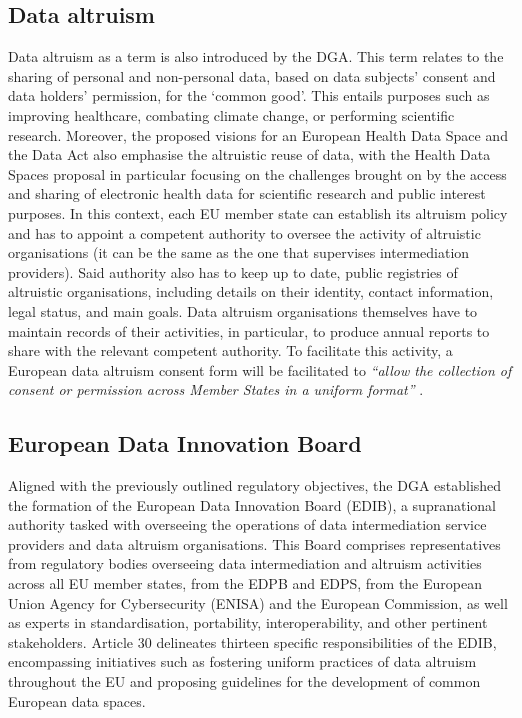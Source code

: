 \subsection{Data altruism}
\label{sec:altruism}

Data altruism as a term is also introduced by the DGA.
This term relates to the sharing of personal and non-personal data, based on data subjects' consent and data holders' permission, for the `common good'.
This entails purposes such as improving healthcare, combating climate change, or performing scientific research.
Moreover, the proposed visions for an European Health Data Space \citeyearpar{noauthor_proposal_2022} and the Data Act \citeyearpar{noauthor_dataact_2022} also emphasise the altruistic reuse of data, with the Health Data Spaces proposal in particular focusing on the challenges brought on by the access and sharing of electronic health data for scientific research and public interest purposes.
In this context, each EU member state can establish its altruism policy and has to appoint a competent authority to oversee the activity of altruistic organisations (it can be the same as the one that supervises intermediation providers).
Said authority also has to keep up to date, public registries of altruistic organisations, including details on their identity, contact information, legal status, and main goals.
Data altruism organisations themselves have to maintain records of their activities, in particular, to produce annual reports to share with the relevant competent authority.
To facilitate this activity, a European data altruism consent form will be facilitated  to \textit{``allow the collection of consent or permission across Member States in a uniform format''} \citeyearpar{noauthor_regulation_2022}.

\subsection{European Data Innovation Board}
\label{sec:edib}

Aligned with the previously outlined regulatory objectives, the DGA established the formation of the European Data Innovation Board (EDIB), a supranational authority tasked with overseeing the operations of data intermediation service providers and data altruism organisations.
This Board comprises representatives from regulatory bodies overseeing data intermediation and altruism activities across all EU member states, from the EDPB and EDPS, from the European Union Agency for Cybersecurity (ENISA) and the European Commission, as well as experts in standardisation, portability, interoperability, and other pertinent stakeholders.
Article 30 \citeyearpar{noauthor_regulation_2022} delineates thirteen specific responsibilities of the EDIB, encompassing initiatives such as fostering uniform practices of data altruism throughout the EU and proposing guidelines for the development of common European data spaces.

